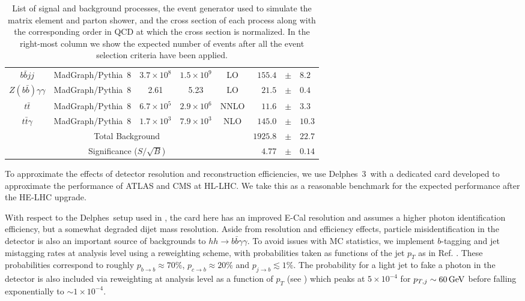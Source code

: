 \begin{table}
\begin{tabular}{|c|c|cc|c|rcl|}
$b\bar{b}jj$                  					& {\sc\small MadGraph}/{\sc\small Pythia~8} 	& $3.7\times 10^{8}$     	& $1.5\times 10^{9}$     & LO 				& $155.4$ 	& $\pm$ & $8.2$ \\
$Z(b\bar{b})\gamma\gamma$   		& {\sc\small MadGraph}/{\sc\small Pythia~8} 	& 2.61     			& 5.23      			& LO 											& $21.5$ 		& $\pm$ & $0.4$ \\ \hline
$t\bar{t}$                    					& {\sc\small MadGraph}/{\sc\small Pythia~8} 	& $6.7\times 10^{5}$     	& $2.9\times 10^{6}$     	& NNLO 		& $11.6$ 		& $\pm$ & $3.3$ \\
$t\bar{t}\gamma$              				& {\sc\small MadGraph}/{\sc\small Pythia~8} 	& $1.7\times 10^{3}$     	& $7.9\times 10^{3}$     & NLO 				& $145.0$ 	& $\pm$ & $10.3$ \\ \hline
\multicolumn{5}{|c|}{Total Background}					& $1925.8$ & $\pm$ & $22.7$ \\ \hline
\multicolumn{5}{|c|}{Significance ($S/\sqrt{B}$)}		& $4.77$ & $\pm$ & $0.14$ \\ \hline
\end{tabular}
\caption{List of signal and background processes, the event generator used to simulate the matrix element and parton shower, and the cross section of each process along with the corresponding order in QCD at which the cross section is normalized. In the right-most column we show the expected number of events after all the event selection criteria have been applied.}
\label{t.backgrounds}
\end{table}
\endgroup


To approximate the effects of detector resolution and reconstruction efficiencies, we use {\sc\small Delphes~3}\ with a dedicated card developed to approximate the performance of ATLAS and CMS at HL-LHC. We take this as a reasonable benchmark for the expected performance after the HE-LHC upgrade.

With respect to the {\sc\small Delphes}\ setup used in \cite{Homiller:2018dgu}, the card here has an improved E-Cal resolution and assumes a higher photon identification efficiency, but a somewhat degraded dijet mass resolution. Aside from resolution and efficiency effects, particle misidentification in the detector is also an important source of backgrounds to $hh\rightarrow b\bar{b}\gamma\gamma$. To avoid issues with MC statistics, we implement $b$-tagging and jet mistagging rates at analysis level using a reweighting scheme, with probabilities taken as functions of the jet $p_T$ as in Ref. \cite{Homiller:2018dgu}. These probabilities correspond to roughly $p_{b\rightarrow b} \approx 70\%$, $p_{c\rightarrow b} \approx 20\%$ and $p_{j\rightarrow b} \lesssim 1\%$. The probability for a light jet to fake a photon in the detector is also included via reweighting at analysis level as a function of $p_T$ (see \cite{Homiller:2018dgu}) which peaks at $5\times 10^{-4}$ for $p_{T,j} \sim 60\, {\rm GeV}$ before falling exponentially to $\sim 1\times 10^{-4}$.


